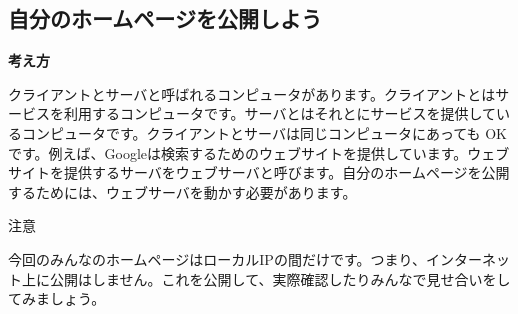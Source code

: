 \documentclass[text06.tex]{subfiles}
\begin{document}

%
%
\subsection{自分のホームページを公開しよう\label{E:myHP}}
{\bfseries 考え方}


クライアントとサーバと呼ばれるコンピュータがあります。クライアントとはサービスを利用するコンピュータです。サーバとはそれとにサービスを提供しているコンピュータです。クライアントとサーバは同じコンピュータにあっても
OK です。例えば、Googleは検索するためのウェブサイトを提供しています。ウェブサイトを提供するサーバをウェブサーバと呼びます。自分のホームページを公開するためには、ウェブサーバを動かす必要があります。

注意

今回のみんなのホームページはローカルIPの間だけです。つまり、インターネット上に公開はしません。これを公開して、実際確認したりみんなで見せ合いをしてみましょう。


\bigskip
\end{document}

